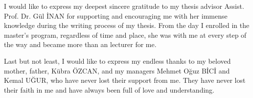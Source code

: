 I would like to express my deepest sincere gratitude to my thesis advisor Assist. Prof. Dr. Gül İNAN for supporting and encouraging me with her immense knowledge during the writing process of my thesis. From the day I enrolled in the master's program, regardless of time and place, she was with me at every step of the way and became more than an lecturer for me.

Last but not least, I would like to express my endless thanks to my beloved mother, father, Kübra ÖZCAN, and my managers Mehmet Oğuz BİCİ and Kemal UĞUR, who have never lost their support from me. They have never lost their faith in me and have always been full of love and understanding.